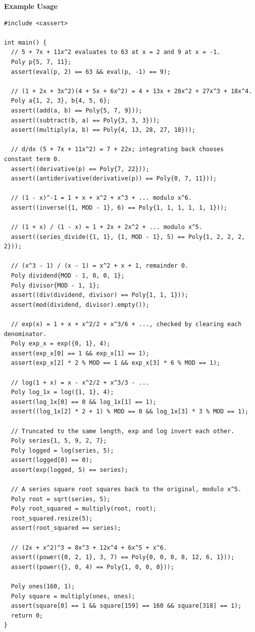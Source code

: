 \textbf{Example Usage}\par
\begin{lstlisting}[style=cpp]
#include <cassert>

int main() {
  // 5 + 7x + 11x^2 evaluates to 63 at x = 2 and 9 at x = -1.
  Poly p{5, 7, 11};
  assert(eval(p, 2) == 63 && eval(p, -1) == 9);

  // (1 + 2x + 3x^2)(4 + 5x + 6x^2) = 4 + 13x + 28x^2 + 27x^3 + 18x^4.
  Poly a{1, 2, 3}, b{4, 5, 6};
  assert((add(a, b) == Poly{5, 7, 9}));
  assert((subtract(b, a) == Poly{3, 3, 3}));
  assert((multiply(a, b) == Poly{4, 13, 28, 27, 18}));

  // d/dx (5 + 7x + 11x^2) = 7 + 22x; integrating back chooses constant term 0.
  assert((derivative(p) == Poly{7, 22}));
  assert((antiderivative(derivative(p)) == Poly{0, 7, 11}));

  // (1 - x)^-1 = 1 + x + x^2 + x^3 + ... modulo x^6.
  assert((inverse({1, MOD - 1}, 6) == Poly{1, 1, 1, 1, 1, 1}));

  // (1 + x) / (1 - x) = 1 + 2x + 2x^2 + ... modulo x^5.
  assert((series_divide({1, 1}, {1, MOD - 1}, 5) == Poly{1, 2, 2, 2, 2}));

  // (x^3 - 1) / (x - 1) = x^2 + x + 1, remainder 0.
  Poly dividend{MOD - 1, 0, 0, 1};
  Poly divisor{MOD - 1, 1};
  assert((div(dividend, divisor) == Poly{1, 1, 1}));
  assert(mod(dividend, divisor).empty());

  // exp(x) = 1 + x + x^2/2 + x^3/6 + ..., checked by clearing each denominator.
  Poly exp_x = exp({0, 1}, 4);
  assert(exp_x[0] == 1 && exp_x[1] == 1);
  assert(exp_x[2] * 2 % MOD == 1 && exp_x[3] * 6 % MOD == 1);

  // log(1 + x) = x - x^2/2 + x^3/3 - ...
  Poly log_1x = log({1, 1}, 4);
  assert(log_1x[0] == 0 && log_1x[1] == 1);
  assert((log_1x[2] * 2 + 1) % MOD == 0 && log_1x[3] * 3 % MOD == 1);

  // Truncated to the same length, exp and log invert each other.
  Poly series{1, 5, 9, 2, 7};
  Poly logged = log(series, 5);
  assert(logged[0] == 0);
  assert(exp(logged, 5) == series);

  // A series square root squares back to the original, modulo x^5.
  Poly root = sqrt(series, 5);
  Poly root_squared = multiply(root, root);
  root_squared.resize(5);
  assert(root_squared == series);

  // (2x + x^2)^3 = 8x^3 + 12x^4 + 6x^5 + x^6.
  assert((power({0, 2, 1}, 3, 7) == Poly{0, 0, 0, 8, 12, 6, 1}));
  assert((power({}, 0, 4) == Poly{1, 0, 0, 0}));

  Poly ones(160, 1);
  Poly square = multiply(ones, ones);
  assert(square[0] == 1 && square[159] == 160 && square[318] == 1);
  return 0;
}
\end{lstlisting}
